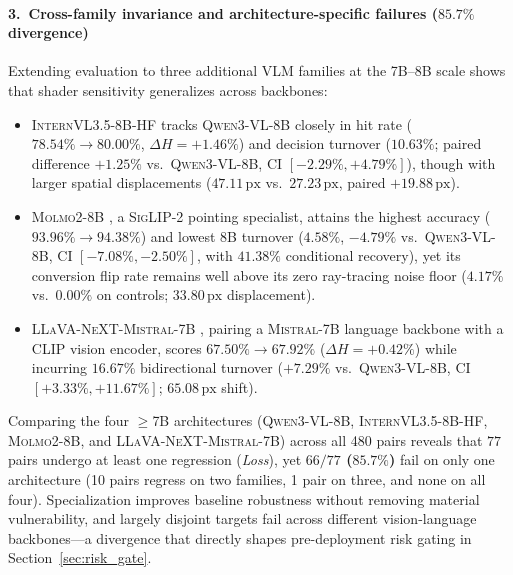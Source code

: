 \paragraph{3.\ Cross-family invariance and architecture-specific failures ($85.7\%$ divergence)}
Extending evaluation to three additional VLM families at the 7B--8B scale shows that shader sensitivity generalizes across backbones:
\begin{itemize}
    \item \textsc{InternVL3.5-8B-HF} \citep{Wang2025InternVL35} tracks \textsc{Qwen3-VL-8B} closely in hit rate ($78.54\% \to 80.00\%$, $\Delta H = +1.46\%$) and decision turnover ($10.63\%$; paired difference $+1.25\%$ vs.\ \textsc{Qwen3-VL-8B}, CI $[-2.29\%, +4.79\%]$), though with larger spatial displacements ($47.11\,\mathrm{px}$ vs.\ $27.23\,\mathrm{px}$, paired $+19.88\,\mathrm{px}$).
    \item \textsc{Molmo2-8B} \citep{Clark2026Molmo2}, a \textsc{SigLIP-2} pointing specialist, attains the highest accuracy ($93.96\% \to 94.38\%$) and lowest 8B turnover ($4.58\%$, $-4.79\%$ vs.\ \textsc{Qwen3-VL-8B}, CI $[-7.08\%, -2.50\%]$, with $41.38\%$ conditional recovery), yet its conversion flip rate remains well above its zero ray-tracing noise floor ($4.17\%$ vs.\ $0.00\%$ on controls; $33.80\,\mathrm{px}$ displacement).
    \item \textsc{LLaVA-NeXT-Mistral-7B} \citep{Liu2024LLaVANeXT}, pairing a \textsc{Mistral-7B} language backbone with a \textsc{CLIP} vision encoder, scores $67.50\% \to 67.92\%$ ($\Delta H = +0.42\%$) while incurring $16.67\%$ bidirectional turnover ($+7.29\%$ vs.\ \textsc{Qwen3-VL-8B}, CI $[+3.33\%, +11.67\%]$; $65.08\,\mathrm{px}$ shift).
\end{itemize}
Comparing the four $\ge$7B architectures (\textsc{Qwen3-VL-8B}, \textsc{InternVL3.5-8B-HF}, \textsc{Molmo2-8B}, and \textsc{LLaVA-NeXT-Mistral-7B}) across all 480 pairs reveals that $77$ pairs undergo at least one regression (\emph{Loss}), yet \textbf{$66/77$ ($85.7\%$)} fail on only one architecture (10 pairs regress on two families, 1 pair on three, and none on all four). Specialization improves baseline robustness without removing material vulnerability, and largely disjoint targets fail across different vision-language backbones---a divergence that directly shapes pre-deployment risk gating in Section~\ref{sec:risk_gate}.

\begin{table}[!t]
\centering\scriptsize
\resizebox{\textwidth}{!}{}
\caption{Full 30-scene (480-pair) visual grounding results across four VLM families and six checkpoints under deterministic greedy decoding ($T{=}0$), with paired 10,000-draw scene-cluster 95\% confidence intervals. Near-zero net accuracy shifts ($\Delta H$) conceal substantial bidirectional Loss/Gain turnover and $85.7\%$ single-architecture regression divergence.}
\label{tab:grounding_v3}
\end{table}
